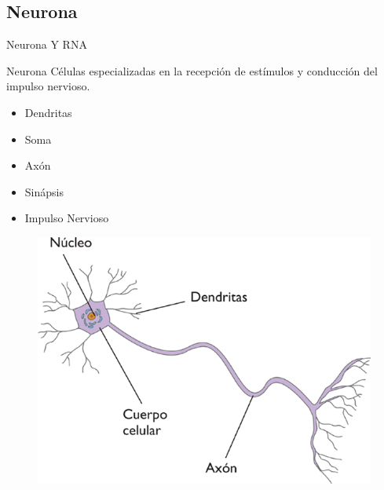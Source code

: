 \documentclass{beamer}
\begin{document}
\subsection{Neurona}
\begin{frame}{Neurona Y RNA}
\begin{block}{Neurona}
Células especializadas en la recepción de estímulos y conducción del impulso
nervioso.\pause
\begin{itemize}
\item {Dendritas\pause}
\item {Soma\pause}
\item {Axón\pause}
\item {Sinápsis\pause}
\item {Impulso Nervioso}
\end{itemize}
\begin{figure}
\includegraphics[scale=0.2]{neurona.png}
\centering
\end{figure}
\end{block}
\end{frame}
\end{document}

